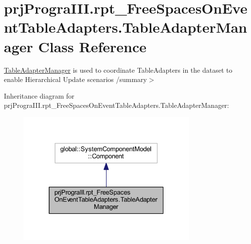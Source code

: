 \hypertarget{classprj_progra_i_i_i_1_1rpt___free_spaces_on_event_table_adapters_1_1_table_adapter_manager}{}\section{prj\+Progra\+I\+I\+I.\+rpt\+\_\+\+Free\+Spaces\+On\+Event\+Table\+Adapters.\+Table\+Adapter\+Manager Class Reference}
\label{classprj_progra_i_i_i_1_1rpt___free_spaces_on_event_table_adapters_1_1_table_adapter_manager}


\hyperlink{classprj_progra_i_i_i_1_1rpt___free_spaces_on_event_table_adapters_1_1_table_adapter_manager}{Table\+Adapter\+Manager} is used to coordinate Table\+Adapters in the dataset to enable Hierarchical Update scenarios /summary$>$  




Inheritance diagram for prj\+Progra\+I\+I\+I.\+rpt\+\_\+\+Free\+Spaces\+On\+Event\+Table\+Adapters.\+Table\+Adapter\+Manager\+:
\nopagebreak
\begin{figure}[H]
\begin{center}
\leavevmode
\includegraphics[width=256pt]{classprj_progra_i_i_i_1_1rpt___free_spaces_on_event_table_adapters_1_1_table_adapter_manager__inherit__graph}
\end{center}
\end{figure}



